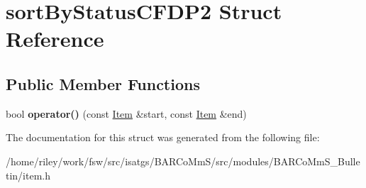 \hypertarget{structsort_by_status_c_f_d_p2}{}\section{sort\+By\+Status\+C\+F\+D\+P2 Struct Reference}
\label{structsort_by_status_c_f_d_p2}
\subsection*{Public Member Functions}
\begin{DoxyCompactItemize}
\item 
bool {\bfseries operator()} (const \hyperlink{class_item}{Item} \&start, const \hyperlink{class_item}{Item} \&end)\hypertarget{structsort_by_status_c_f_d_p2_ab4bd1e199a982b6cc924a9fe916095f4}{}\label{structsort_by_status_c_f_d_p2_ab4bd1e199a982b6cc924a9fe916095f4}

\end{DoxyCompactItemize}


The documentation for this struct was generated from the following file\+:\begin{DoxyCompactItemize}
\item 
/home/riley/work/fsw/src/isatgs/\+B\+A\+R\+Co\+Mm\+S/src/modules/\+B\+A\+R\+Co\+Mm\+S\+\_\+\+Bulletin/item.\+h\end{DoxyCompactItemize}
